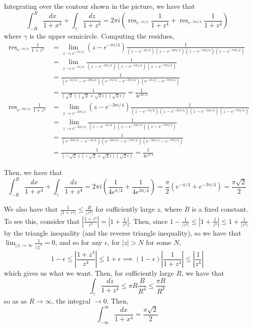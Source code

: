 \documentclass[12pt,letterpaper]{article}
\theoremstyle{definition}
\DeclareMathOperator{\res}{res}
\begin{document}
Integrating over the contour shown in the picture, we have that
\[
  \int_{-R}^{R}\frac{dx}{1+x^{4}} + \int_{\gamma}\frac{dz}{1 + z^{4}} = 2\pi i\left(\res_{e^{-\pi i/4}}\frac{1}{1+z^{4}} + \res_{e^{-3\pi i/4}}\frac{1}{1+z^{4}}\right)
\]
where $\gamma$ is the upper semicircle. Computing the residues,
\begin{align*}
  \res_{e^{-\pi i/4}}\frac{1}{1+z^{4}} &= \lim_{z \rightarrow e^{-\pi i/4}}(z - e^{-\pi i/4})\frac{1}{(z - e^{-\pi i/4})(z - e^{-3\pi i/4})(z - e^{-5\pi i/4})(z - e^{-7\pi i/4})} \\
                                     &= \lim_{z \rightarrow e^{-\pi i/4}}\frac{1}{(z - e^{-3\pi i/4})(z - e^{-5\pi i/4})(z - e^{-7\pi i/4})} \\
                                     &= \frac{1}{(e^{-\pi i/4} - e^{-3\pi i/4})(e^{-\pi i/4} - e^{-5\pi i/4})(e^{-\pi i/4} - e^{-7\pi i/4})} \\
                                     &= \frac{1}{(\sqrt{2})(\sqrt{2} + \sqrt{2}i)(\sqrt{2}i)} = \frac{1}{4e^{3\pi/4}} \\
  \res_{e^{-3\pi i/4}}\frac{1}{1+z^{4}} &= \lim_{z \rightarrow e^{-3\pi i/4}}(z - e^{-3\pi i/4})\frac{1}{(z - e^{-\pi i/4})(z - e^{-3\pi i/4})(z - e^{-5\pi i/4})(z - e^{-7\pi i/4})} \\
                                     &= \lim_{z \rightarrow e^{-3\pi i/4}}\frac{1}{(z - e^{-\pi i/4})(z - e^{-5\pi i/4})(z - e^{-7\pi i/4})} \\
                                     &= \frac{1}{(e^{-3\pi i/4} - e^{-\pi i/4})(e^{-3\pi i/4} - e^{-5\pi i/4})(e^{-3\pi i/4} - e^{-7\pi i/4})} \\
                                     &= \frac{1}{(-\sqrt{2})(-\sqrt{2} + \sqrt{2}i)(\sqrt{2}i)} = \frac{1}{4e^{\pi/4}}
\end{align*}

Then, we have that
\[
  \int_{-R}^{R}\frac{dx}{1+x^{4}} + \int_{\gamma}\frac{dz}{1 + z^{4}} = 2\pi i\left(\frac{1}{4e^{\pi/4}} + \frac{1}{4e^{3\pi/4}}\right) = \frac{\pi}{2}(e^{-\pi/4} + e^{-3\pi/4}) = \frac{\pi\sqrt{2}}{2}
\]

We also have that $\frac{1}{|1 + z^{4}|} \leq \frac{B}{|z^{4}|}$ for sufficiently large $z$, where $B$ is a fixed constant. To see this, consider that $\left|\frac{1 + z^{4}}{z^{4}}\right| = \left|1 + \frac{1}{z^{4}}\right|$. Then, since $1 - \frac{1}{|z^{4}|} \leq \left|1 + \frac{1}{z^{4}}\right| \leq 1 + \frac{1}{|z^{4}|}$ by the triangle inequality (and the reverse triangle inequality), so we have that $\lim_{|z| \rightarrow \infty}\frac{1}{|z|^{4}} = 0$, and so for any $\epsilon$, for $|z| > N$ for some $N$,
\[
  1 - \epsilon \leq \left|\frac{1 + z^{4}}{z^{4}}\right| \leq 1 + \epsilon \implies (1-\epsilon)\left|\frac{1 }{1 + z^{4}}\right| \leq \left|\frac{1}{z^{4}}\right|
\]
which gives us what we want. Then, for sufficiently large $R$, we have that
\[
  \int_{\gamma} \frac{dz}{1 + z^{4}} \leq \pi R \frac{B}{R^{4}} \leq \frac{\pi B}{R^{3}}
\]
so as as $R \rightarrow \infty$, the integral $\rightarrow 0$. Then,
\[
  \int_{-\infty}^{\infty}\frac{dx}{1+x^{4}} = \frac{\pi\sqrt{2}}{2}
\]
\end{document}
